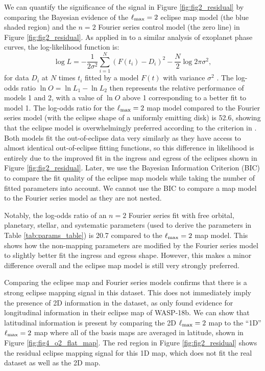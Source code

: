 \documentclass[twocolumn]{aastex631}
\begin{document}
We can quantify the significance of the signal in Figure \ref{fig:fig2_residual} by comparing the Bayesian evidence of the $\ell_{\rm max}=2$ eclipse map model (the blue shaded region) and the $n=2$ Fourier series control model (the zero line) in Figure \ref{fig:fig2_residual}. As applied in \citet{placek2017analyzing} to a similar analysis of exoplanet phase curves, the log-likelihood function is:
%
\begin{equation}
    \log L=-\frac{1}{2 \sigma^2} \sum_{i=1}^N\left(F(t_{i})-D_{i}\right)^2-\frac{N}{2} \log 2 \pi \sigma^2,
\end{equation}
%
for data $D_{i}$ at $N$ times $t_{i}$ fitted by a model $F(t)$ with variance $\sigma^{2}$ . The log-odds ratio $\ln O = \ln L_{1} - \ln L_{2}$ then represents the relative performance of models 1 and 2, with a value of $\ln O$ above 1 corresponding to a better fit to model 1. The log-odds ratio for the $\ell_{\rm max}=2$ map model compared to the Fourier series model (with the eclipse shape of a uniformly emitting disk) is 52.6, showing that the eclipse model is overwhelmingly preferred according to the criterion in \citet{placek2017analyzing}. Both models fit the out-of-eclipse data very similarly as they have access to almost identical out-of-eclipse fitting functions, so this difference in likelihood is entirely due to the improved fit in the ingress and egress of the eclipses shown in Figure \ref{fig:fig2_residual}. Later, we use the Bayesian Information Criterion (BIC) to compare the fit quality of the eclipse map models while taking the number of fitted parameters into account. We cannot use the BIC to compare a map model to the Fourier series model as they are not nested.

Notably, the log-odds ratio of an $n=2$ Fourier series fit with free orbital, planetary, stellar, and systematic parameters (used to derive the parameters in Table \ref{tab:params_table}) is 20.7 compared to the $\ell_{\rm max}=2$ map model. This shows how the non-mapping parameters are modified by the Fourier series model to slightly better fit the ingress and egress shape. However, this makes a minor difference overall and the eclipse map model is still very strongly preferred.

Comparing the eclipse map and Fourier series models confirms that there is a strong eclipse mapping signal in this dataset. This does not immediately imply the presence of 2D information in the dataset, as \citet{coulombe2023wasp18b} only found evidence for longitudinal information in their eclipse map of WASP-18b. We can show that latitudinal information is present by comparing the 2D $\ell_{\rm max}=2$ map to the ``1D'' $\ell_{\rm max}=2$ map where all of the basis maps are averaged in latitude, shown in Figure \ref{fig:fig4_o2_flat_map}. The red region in Figure \ref{fig:fig2_residual} shows the residual eclipse mapping signal for this 1D map, which does not fit the real dataset as well as the 2D map.  
\end{document}
